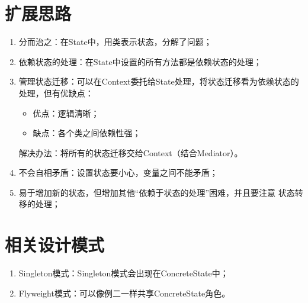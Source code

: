 \section{扩展思路}
\begin{enumerate}
	\item 分而治之：在State中，用类表示状态，分解了问题；
	\item 依赖状态的处理：在State中设置的所有方法都是依赖状态的处理；
	\item 管理状态迁移：可以在Context委托给State处理，将状态迁移看为依赖状态的处理，但有优缺点：
	\begin{itemize}
		\item 优点：逻辑清晰；
		\item 缺点：各个类之间依赖性强；
	\end{itemize}
	解决办法：将所有的状态迁移交给Context（结合Mediator）。
	\item 不会自相矛盾：设置状态要小心，变量之间不能矛盾；
	\item 易于增加新的状态，但增加其他“依赖于状态的处理”困难，并且要注意
	状态转移的处理；
\end{enumerate}
\section{相关设计模式}
\begin{enumerate}
	\item Singleton模式：Singleton模式会出现在ConcreteState中；
	\item Flyweight模式：可以像例二一样共享ConcreteState角色。
\end{enumerate}
